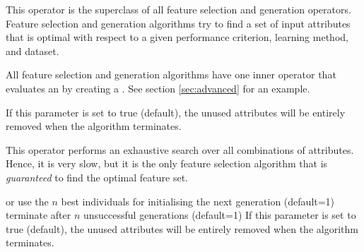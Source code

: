 \opdescr This operator is the superclass of all feature selection and 
generation operators. Feature selection and generation algorithms try
to find a set of input attributes that is optimal with respect to a
given performance criterion, learning method, and dataset.

All feature selection and generation algorithms have one inner
operator that evaluates an  by creating a
. See section \ref{sec:advanced} for an example.








\featureoperatorio

\begin{parameters}
 If this parameter is set to true (default),
the unused attributes will be entirely removed when the algorithm terminates.
\end{parameters}

\begin{values}
\featureoperatorvalues
\end{values}

\opdescr This operator performs an exhaustive search over all
combinations of attributes. Hence, it is very slow, but it is the only
feature selection algorithm that is {\em guaranteed} to find the optimal feature set.





\featureoperatorio

\begin{parameters}
  or 
 use the $n$ best individuals for initialising the
next generation (default=1)
 terminate after $n$
unsuccessful generations (default=1)
 If this parameter is set to true (default),
the unused attributes will be entirely removed when the algorithm
terminates.
\end{parameters}

\begin{values}
\featureoperatorvalues
\end{values}

